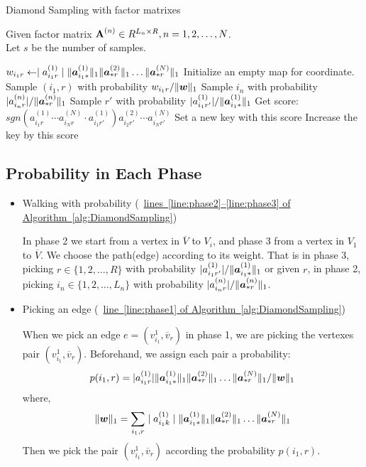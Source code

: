 \documentclass[letterpaper]{article}
\newcommand{\Sca}[3]{{#1}^{(#2)}_{i_#2#3}}%
\newcommand{\V}[1]{{\bm{{\MakeLowercase{#1}}}}}
\newcommand{\Varow}[1]{\V{a}^{(#1)}_{i_#1*}}
\newcommand{\Vacol}[1]{\V{a}^{(#1)}_{*r}}
\newcommand{\M}[1]{{\bm{\mathbf{\MakeUppercase{#1}}}}}
\newcommand{\norm}[2]{\|#1\|_{#2}}
\newcommand{\AlgLine}[2]{\hyperref[alg:#1]{line~\ref*{line:#2} of Algorithm~\ref*{alg:#1}}}
\newcommand{\AlgLines}[3]{\hyperref[alg:#1]{lines~\ref*{line:#2}--\ref*{line:#3} of Algorithm~\ref*{alg:#1}}}
\begin{document}
\begin{algorithm}[t]
    \caption{Diamond Sampling with factor matrixes}
    \label{alg:DiamondSampling}
    Given factor matrix $\M{A}^{(n)}\in R^{L_n\times R}, n = 1,2,\ldots,N$.\\
    Let $s$ be the number of samples.
    \begin{algorithmic}[1]
    \State $w_{i_1r} \leftarrow \mid \Sca{a}{1}{r}\mid
    \norm{\Varow{1}}{1}\norm{\Vacol{2}}{1}\ldots\norm{\Vacol{N}}{1} $
    \EndFor
    \State Initialize an empty map for coordinate.
    \State Sample $(i_1,r)$ with probability $w_{i_1r}/\norm{\V{W}}{1}$        \label{line:phase1}
    \State Sample $i_n$ with probability $|\Sca{a}{n}{r}|/\norm{\Vacol{n}}{1}$
    \label{line:phase2}
    \EndFor
    \State Sample $r'$ with probability $|\Sca{a}{1}{r'}|/\norm{\Varow{1}}{1}$
    \label{line:phase3}
    \State \label{line:scoring}
        Get score: $sgn(\Sca{a}{1}{r}\cdots\Sca{a}{N}{r}\cdot\Sca{a}{1}{r'})
    \Sca{a}{2}{r'}\cdots\Sca{a}{N}{r'}$
    \State  Set a new key with this score
    \Else
    \State Increase the key by this score
    \EndIf
    \EndFor
    \end{algorithmic}
\end{algorithm}

\subsection{Probability in Each Phase}

\begin{itemize}
  \item Walking with probability  (~\AlgLines{DiamondSampling}{phase2}{phase3})

  In phase 2 we start from a vertex in $\overline{V}$ to $V_i$, and phase 3 from a vertex in $V_1$ to $\overline{V}$. We choose the path(edge) according to its weight. That is in phase 3, picking $r\in\{1,2,\ldots,R\}$ with probability $|\Sca{a}{1}{r'}|/\norm{\Varow{1}}{1}$ or given $r$, in phase 2, picking $i_n\in\{1,2,\ldots,L_n\}$ with probability $|\Sca{a}{n}{r}|/\norm{\Vacol{n}}{1}$.

  \item Picking an edge (~\AlgLine{DiamondSampling}{phase1})

  When we pick an edge $e=(v^1_{i_1},\overline{v}_r)$ in phase 1, we are picking the vertexes pair $(v^1_{i_1},\overline{v}_r)$. Beforehand, we assign each pair a probability:
  \[
    p(i_1,r) = |\Sca{a}{1}{r}|\norm{\Varow{1}}{1} \norm{\Vacol{2}}{1} \ldots \norm{\Vacol{N}}{1} / \norm{\V{W}}{1}
  \]
  where,
  \[
    \norm{\V{W}}{1} = \sum_{i_1,r}\mid \Sca{a}{1}{k}\mid \norm{\Varow{1}}{1} \norm{\Vacol{2}}{1} \ldots \norm{\Vacol{N}}{1}
  \]
  Then we pick the pair $(v^1_{i_1},\overline{v}_r)$ according the probability $p(i_1,r)$.
\end{itemize}
\end{document}
